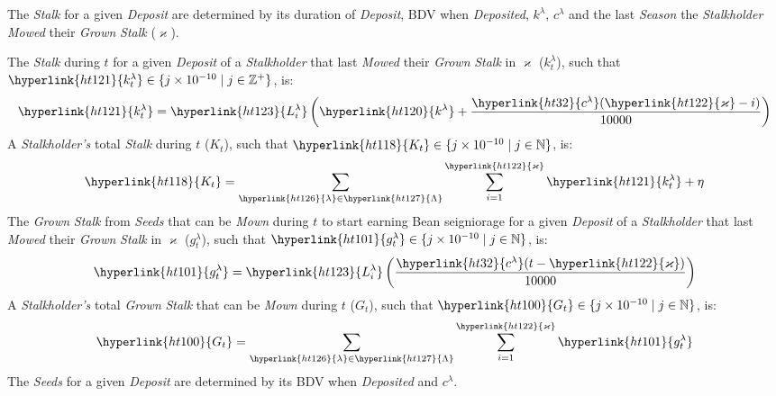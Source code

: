 \documentclass[tikz]{article}
\newcommand{\term}[1]{\textsl{#1}}
\newcommand{\bean}{} %
\begin{document}
The \term{Stalk} for a given \term{Deposit} are determined by its duration of \term{Deposit}, BDV when \term{Deposited}, \hyperlink{ht120}{$k^{\lambda}$}, \hyperlink{ht32}{$c^{\lambda}$} and the last \term{Season} the \term{Stalkholder} \term{Mowed} their \term{Grown} \term{Stalk} (\hyperlink{ht122}{$\varkappa$}).

The \term{Stalk} during \hyperlink{ht204}{$t$} for a given \term{Deposit} of a \term{Stalkholder} that last \term{Mowed} their \term{Grown} \term{Stalk} in \hyperlink{ht122}{$\varkappa$} (\hyperlink{ht121}{$k_{t}^{\lambda}$}), such that $\hyperlink{ht121}{k_{t}^{\lambda}} \in \{j \times 10^{-10} \mid j \in \mathbb{Z}^{+} \}$, is:
$$\hyperlink{ht121}{k_{t}^{\lambda}} = \hyperlink{ht123}{L_i^{\lambda}}\left(\hyperlink{ht120}{k^{\lambda}} + \frac{\hyperlink{ht32}{c^{\lambda}}(\hyperlink{ht122}{\varkappa} - i)}{10000}\right)$$
A \term{Stalkholder's} total \term{Stalk} during \hyperlink{ht204}{$t$} (\hyperlink{ht118}{$K_t$}), such that $\hyperlink{ht118}{K_t} \in \{j \times 10^{-10} \mid j \in \mathbb{N} \}$, is:
$$\hyperlink{ht118}{K_t} = \sum_{\hyperlink{ht126}{\lambda} \in \hyperlink{ht127}{\Lambda}} \sum_{i=1}^{\hyperlink{ht122}{\varkappa}} \hyperlink{ht121}{k_{t}^{\lambda}} + \eta^{\bean}$$
The \term{Grown} \term{Stalk} from \term{Seeds} that can be \term{Mown} during \hyperlink{ht204}{$t$} to start earning Bean seigniorage for a given \term{Deposit} of a \term{Stalkholder} that last \term{Mowed} their \term{Grown} \term{Stalk} in \hyperlink{ht122}{$\varkappa$} (\hyperlink{ht101}{$g_{t}^{\lambda}$}), such that $\hyperlink{ht101}{g_{t}^{\lambda}} \in \{j \times 10^{-10} \mid j \in \mathbb{N} \}$, is:
$$\hyperlink{ht101}{g_{t}^{\lambda}} = \hyperlink{ht123}{L_i^{\lambda}}\left(\frac{\hyperlink{ht32}{c^{\lambda}}(t - \hyperlink{ht122}{\varkappa})}{10000}\right)$$
A \term{Stalkholder's} total \term{Grown} \term{Stalk} that can be \term{Mown} during \hyperlink{ht204}{$t$} (\hyperlink{ht100}{$G_t$}), such that $\hyperlink{ht100}{G_t} \in \{j \times 10^{-10} \mid j \in \mathbb{N} \}$, is:
$$\hyperlink{ht100}{G_t} = \sum_{\hyperlink{ht126}{\lambda} \in \hyperlink{ht127}{\Lambda}} \sum_{i=1}^{\hyperlink{ht122}{\varkappa}} \hyperlink{ht101}{g_{t}^{\lambda}}$$
The \term{Seeds} for a given \term{Deposit} are determined by its BDV when \term{Deposited} and \hyperlink{ht32}{$c^{\lambda}$}.
\end{document}
